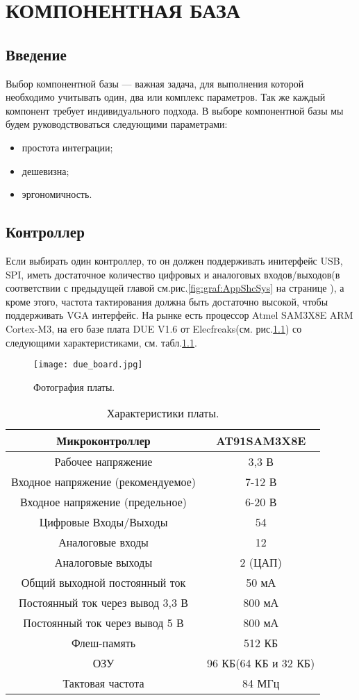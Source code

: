 \chapter{КОМПОНЕНТНАЯ БАЗА}
\section{Введение}
Выбор компонентной базы --- важная задача, для выполнения которой необходимо учитывать один, два или комплекс параметров. Так же каждый компонент требует индивидуального подхода.
В выборе компонентной базы мы будем руководствоваться следующими параметрами:
\begin{itemize}
\item простота интеграции;
\item дешевизна;
\item эргономичность.
\end{itemize}

\section{Контроллер}
Если выбирать один контроллер, то он должен поддерживать инитерфейс USB, SPI, иметь достаточное количество цифровых и аналоговых входов/выходов(в соответствии с предыдущей главой см.рис.\ref{fig:graf:AppShcSys} на странице \pageref{fig:graf:AppShcSys}), а кроме этого, частота тактирования должна быть достаточно высокой, чтобы поддерживать VGA интерфейс. На рынке есть процессор Atmel SAM3X8E ARM Cortex-M3, на его базе плата DUE V1.6 от Elecfreaks(см. рис.\ref{fig:DueBoard}) со следующими характеристиками, см. табл.\ref{tab:DueBoard}\cite{s_1}.
\begin{figure}[ht]
	\centering
     \texttt{[image: due\_board.jpg]}
	\caption{Фотография платы.}
	\label{fig:DueBoard}
\end{figure}
\begin{table}
\centering
\begin{tabular}{|c|c|}
\hline 
Микроконтроллер & AT91SAM3X8E \\ 
\hline 
Рабочее напряжение & 3,3 В \\ 
\hline 
Входное напряжение (рекомендуемое) & 7-12 В \\ 
\hline 
Входное напряжение (предельное) & 6-20 В \\ 
\hline 
Цифровые Входы/Выходы & 54 \\ 
\hline 
Аналоговые входы & 12 \\ 
\hline 
Аналоговые выходы & 2 (ЦАП) \\ 
\hline 
Общий выходной постоянный ток & 50 мА \\ 
\hline 
Постоянный ток через вывод 3,3 В & 800 мА \\ 
\hline 
Постоянный ток через вывод 5 В & 800 мА \\ 
\hline 
Флеш-память & 512 КБ \\ 
\hline 
ОЗУ & 96 КБ(64 КБ и 32 КБ)\\ 
\hline 
Тактовая частота & 84 МГц \\ 
\hline 
\end{tabular} 
\caption{Характеристики платы.}
\label{tab:DueBoard}
\end{table}

